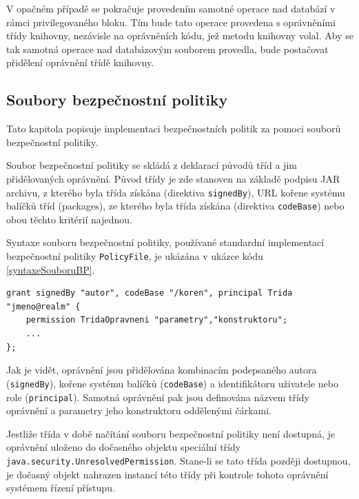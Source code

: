 V opačném případě se pokračuje provedením samotné operace nad databází v rámci privilegovaného bloku. Tím bude tato operace provedena s oprávněními třídy knihovny, nezávisle na oprávněních kódu, jež metodu knihovny volal. Aby se tak samotná operace nad databázovým souborem provedla, bude postačovat přidělení oprávnění třídě knihovny.

\subsection{Soubory bezpečnostní politiky} \label{souboryBP}

Tato kapitola popisuje implementaci bezpečnostních politik za pomoci souborů bezpečnostní politiky.

Soubor bezpečnostní politiky se skládá z deklarací původů tříd a jim přidělovaných oprávnění.
Původ třídy je zde stanoven na základě podpisu JAR archivu, z kterého byla třída získána (direktiva {\tt signedBy}), URL kořene systému balíčků tříd (packages), ze kterého byla třída získána (direktiva {\tt codeBase}) nebo obou těchto kritérií najednou. \cite[5.3.1]{oaks}

Syntaxe souboru bezpečnostní politiky, používané standardní implementací bezpečnostní politiky {\tt PolicyFile}, je ukázána v ukázce kódu \ref{syntaxeSouboruBP}. \cite[5.3.1]{oaks}\cite{refPolicyFiles}

\begin{lstlisting}[caption=Syntaxe souboru bezpečnostní politiky, label=syntaxeSouboruBP]
grant signedBy "autor", codeBase "/koren", principal Trida "jmeno@realm" {
    permission TridaOpravneni "parametry","konstruktoru";
    ...
};
\end{lstlisting}

Jak je vidět, oprávnění jsou přidělována kombinacím podepsaného autora ({\tt signedBy}), kořene systému balíčků ({\tt codeBase}) a identifikátoru uživatele nebo role ({\tt principal}).
Samotná oprávnění pak jsou definována názvem třídy oprávnění a parametry jeho konstruktoru oddělenými čárkami.

Jestliže třída v době načítání souboru bezpečnostní politiky není dostupná, je oprávnění uloženo do dočasného objektu speciální třídy {\tt java.security.UnresolvedPermission}.
Stane-li se tato třída později dostupnou, je dočasný objekt nahrazen instancí této třídy při kontrole tohoto oprávnění systémem řízení přístupu. \cite{refUnresolvedPermission}

